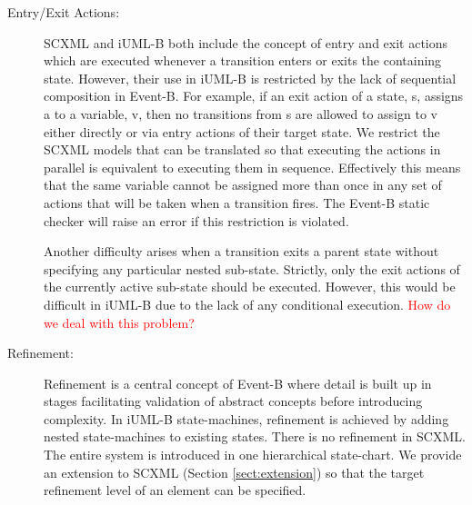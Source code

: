 \begin{description}
\item [Entry/Exit Actions:]
SCXML and iUML-B both include the concept of entry and exit actions which are executed whenever a transition enters or exits the containing state. 
However, their use in iUML-B is restricted by the lack of sequential composition in Event-B. 
For example, if an exit action of a state, s, assigns a to a variable, v, then no transitions from s are allowed to assign to v either directly or via entry actions of their target state.
We restrict the SCXML models that can be translated so that executing the actions in parallel is equivalent to executing them in sequence.
Effectively this means that the same variable cannot be assigned more than once in any set of actions that will be taken when a transition fires. 
The Event-B static checker will raise an error if this restriction is violated.

Another difficulty arises when a transition exits a parent state without specifying any particular nested sub-state. 
Strictly, only the exit actions of the currently active sub-state should be executed. However, this would be difficult in iUML-B due to the lack of any conditional execution.
\textcolor{red} {How do we deal with this problem? }

\item [Refinement:]
Refinement is a central concept of Event-B where detail is built up in stages facilitating validation of abstract concepts before introducing complexity. 
In iUML-B state-machines, refinement is achieved by adding nested state-machines to existing states.
There is no refinement in SCXML. The entire system is introduced in one hierarchical state-chart. We provide an extension to SCXML (Section \ref{sect:extension}) so that the target refinement level of an element can be specified.

\end{description}


%
%


